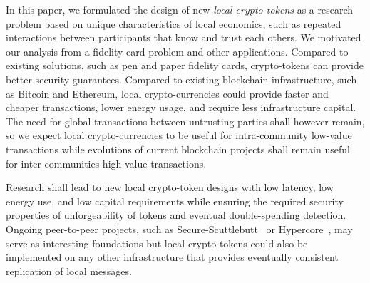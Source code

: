 \documentclass[sigplan,screen,10pt,review,anonymous]{acmart}
\begin{document}
In this paper, we formulated the design of new \textit{local crypto-tokens} as a research problem based on unique characteristics of local economics, such as repeated interactions between participants that know and trust each others. We motivated our analysis from a fidelity card problem and other applications. Compared to existing solutions, such as pen and paper fidelity cards, crypto-tokens can provide better security guarantees. Compared to existing blockchain infrastructure, such as Bitcoin and Ethereum, local crypto-currencies could provide faster and cheaper transactions, lower energy usage, and require less infrastructure capital. The need for global transactions between untrusting parties shall however remain, so we expect local crypto-currencies to be useful for intra-community low-value transactions while evolutions of current blockchain projects shall remain useful for inter-communities high-value transactions.

Research shall lead to new local crypto-token designs with low latency, low energy use, and low capital requirements while ensuring the required security properties of unforgeability of tokens and eventual double-spending detection. Ongoing peer-to-peer projects, such as Secure-Scuttlebutt~\cite{tarr2019ssb} or Hypercore~\cite{hypercore}, may serve as interesting foundations but local crypto-tokens could also be implemented on any other infrastructure that provides eventually consistent replication of local messages.




\end{document}
